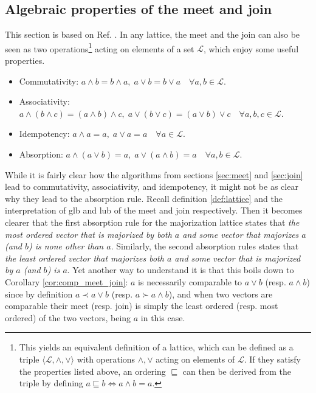  
\subsection{Algebraic properties of the meet and join}

This section is based on Ref. \cite[pp. 39-41]{davey_introduction_2002}. In any lattice, the meet and the join can also be seen as two operations\footnote{This yields an equivalent definition of a lattice, which can be defined as a triple $\langle \mathcal{L}, \wedge, \vee \rangle$ with operations $\wedge, \vee$ acting on elements of $\mathcal{L}$. If they satisfy the properties listed above, an ordering $\sqsubseteq$ can then be derived from the triple by defining $a \sqsubseteq b \iff a \wedge b = a$.}
acting on elements of a set $\mathcal{L}$, which enjoy some useful properties.

\begin{itemize} \label{it:meet_join_properties}
    \item Commutativity: $a \wedge b = b \wedge a, \; a \vee b = b \vee a \quad \forall a, b \in \mathcal{L}$.
    \item Associativity: $a \wedge (b \wedge c) = (a \wedge b) \wedge c, \;
                            a \vee (b \vee c) = (a \vee b) \vee c \quad \forall a, b, c \in \mathcal{L}$.
    \item Idempotency: $a \wedge a = a, \; a \vee a = a \quad \forall a \in \mathcal{L}$.
    \item Absorption: $a \wedge (a \vee b) = a, \; a \vee (a \wedge b) = a \quad \forall a, b \in \mathcal{L}$.
\end{itemize}

While it is fairly clear how the algorithms from sections \ref{sec:meet} and \ref{sec:join} lead to commutativity, associativity, and idempotency, it might not be as clear why they lead to the absorption rule. Recall definition \ref{def:lattice} and the interpretation of glb and lub of the meet and join respectively. Then it becomes clearer that the first absorption rule for the majorization lattice states that \textit{the most ordered vector that is majorized by both $a$ and some vector that majorizes $a$ (and $b$) is none other than $a$}. Similarly, the second absorption rules states that \textit{the least ordered vector that majorizes both $a$ and some vector that is majorized by $a$ (and $b$) is $a$}. Yet another way to understand it is that this boils down to Corollary \ref{cor:comp_meet_join}: $a$ is necessarily comparable to $a \vee b$ (resp. $a \wedge b$) since by definition $a \prec a \vee b$ (resp. $a \succ a \wedge b$), and when two vectors are comparable their meet (resp. join) is simply the least ordered (resp. most ordered) of the two vectors, being $a$ in this case.

